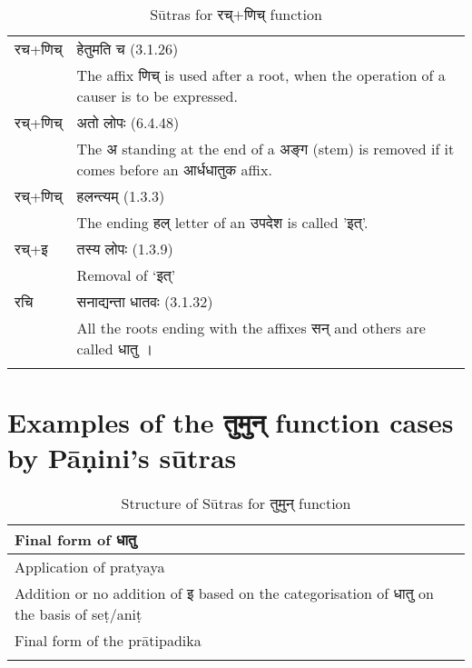 		\begin{longtable}{ | p{1.6cm}|p{14.4cm}| } 
			\hline
			\rowcolor{red!10}
			\texthindi{रच}+\texthindi{णिच्}
			&\texthindi{हेतुमति च} (3.1.26) \\
			\rowcolor{red!10}
			&The affix \texthindi{णिच्} is used after a root, when the operation of a causer is to be expressed.
			\\\hline
			\rowcolor{green!10}
			\texthindi{रच्}+\texthindi{णिच्}
			&\texthindi{अतो लोपः} (6.4.48)\\
			\rowcolor{green!10}
			&The \texthindi{अ} standing at the end of a \texthindi{अङ्ग} (stem) is removed if it comes before an \texthindi{आर्धधातुक} affix.
			\\\hline
			\rowcolor{blue!10}
			\texthindi{रच्}+\texthindi{णिच्}
			&\texthindi{हलन्त्यम्} (1.3.3)\\
			\rowcolor{blue!10}
			&The ending \texthindi{हल्} letter of an \texthindi{उपदेश} is called '\texthindi{इत्}'.
			\\\hline
			\rowcolor{blue!10}
			\texthindi{रच्}+\texthindi{इ}
			&\texthindi{तस्य लोपः} (1.3.9)\\
			\rowcolor{blue!10}
			&Removal of ‘\texthindi{इत्}’
			\\\hline
			\rowcolor{yellow!10}
			\texthindi{रचि}
			&\texthindi{सनाद्यन्ता धातवः} (3.1.32) \\
			\rowcolor{yellow!10}
			&All the roots ending with the affixes \texthindi{सन्} and others are called \texthindi{धातु} । 
			\\\hline
		
		\caption{Sūtras for \texthindi{रच्$+$णिच्} function}
		\label{table:a7}
		\end{longtable}


\section{Examples of the \texthindi{तुमुन्} function cases by Pāṇini’s sūtras}

		\begin{longtable}{ |p{16cm}| } 
			\hline
			\rowcolor{red!10}
			Final form of \texthindi{धातु}\\\hline
			\rowcolor{blue!10}
			Application of pratyaya\\\hline
			\rowcolor{green!10}
			Addition or no addition of \texthindi{इ} based on the categorisation of \texthindi{धातु} on the basis of seṭ/aniṭ\\\hline
			\rowcolor{yellow!10}
			Final form of the  prātipadika \\\hline
		
		\caption{Structure of Sūtras for \texthindi{तुमुन्} function}
		\label{table:a8}
		\end{longtable}


